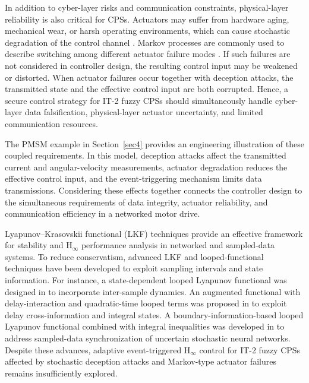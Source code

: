 \documentclass[preprint,review,fleqn,sort&compress,3p]{elsarticle}
\theoremstyle{definition} %
\theoremstyle{definition}%
\begin{document}
In addition to cyber-layer risks and communication constraints, physical-layer
reliability is also critical for CPSs. Actuators may suffer from hardware aging,
mechanical wear, or harsh operating environments, which can cause stochastic
degradation of the control channel
\cite{chenProbabilisticEventTriggeredPolicy2023,caiAdaptiveFaulttolerantControl2025}.
Markov processes are commonly used to describe switching among different actuator
failure modes \cite{yaoMultiSensorBasedSwitchingEventTriggered2024,xuAsynchronousEventTriggeredControl2024}.
If such failures are not considered in controller design, the resulting control
input may be weakened or distorted. When actuator failures occur together with
deception attacks, the
transmitted state and the effective control input are both corrupted. Hence, a
secure control strategy for IT-2 fuzzy CPSs should simultaneously handle
cyber-layer data falsification, physical-layer actuator uncertainty, and limited
communication resources.

The PMSM example in Section~\ref{sec4} provides an engineering illustration of these coupled requirements. In this model, deception attacks affect the transmitted current and angular-velocity measurements, actuator degradation reduces the effective control input, and the event-triggering mechanism limits data transmissions. Considering these effects together connects the controller design to the simultaneous requirements of data integrity, actuator reliability, and communication efficiency in a networked motor drive.

Lyapunov--Krasovskii functional (LKF) techniques provide an effective framework for stability and $\mathrm{H}_\infty$ performance analysis in networked and sampled-data systems. To reduce conservatism, advanced LKF and looped-functional techniques
have been developed to exploit sampling intervals and state information. For
instance, a state-dependent looped Lyapunov functional was designed in
\cite{lianNewResultsStability2020} to incorporate inter-sample dynamics. An
augmented functional with delay-interaction and quadratic-time looped terms was
proposed in \cite{zhangMixedDelayBasedAugmentedFunctional2024} to exploit delay
cross-information and integral states. A boundary-information-based looped
Lyapunov functional combined with integral inequalities was developed in
\cite{ganesanSynchronizationStochasticNeural2024} to address sampled-data synchronization of uncertain stochastic neural networks. Despite these advances, adaptive event-triggered $\mathrm{H}_\infty$ control for IT-2 fuzzy CPSs affected by stochastic deception attacks and Markov-type actuator failures remains insufficiently explored.
\end{document}
